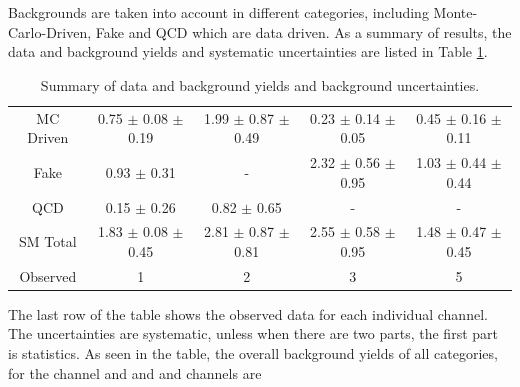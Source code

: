Backgrounds are taken into account in different categories, including Monte-Carlo-Driven, Fake and QCD which are data driven.
As a summary of results, the data and background yields and systematic uncertainties are listed in Table \ref{tbl:yieldSysSummary}. 
\begin{table}[h]
\begin{center}
\begin{tabular}{c|c|c|c|c}
\hline
\hline
		& \tauTau\binone & \tauTau\bintwo & \eTau\binone & \muTau\binone \\
\hline
MC Driven &  0.75 $\pm$ 0.08 $\pm$ 0.19 & 1.99 $\pm$ 0.87 $\pm$ 0.49  & 0.23 $\pm$ 0.14 $\pm$ 0.05 & 0.45 $\pm$ 0.16  $\pm$ 0.11\\
Fake      &     0.93 $\pm$ 0.31         &           -                 &     2.32 $\pm$ 0.56 $\pm$  0.95 & 1.03 $\pm$ 0.44 $\pm$ 0.44\\
QCD       &     0.15 $\pm$ 0.26         &         0.82 $\pm$ 0.65     &           -              &            -       \\
\hline
SM Total  & 1.83 $\pm$ 0.08 $\pm$ 0.45 & 2.81  $\pm$ 0.87 $\pm$0.81  & 2.55 $\pm$ 0.58 $\pm$ 0.95 & 1.48 $\pm$ 0.47  $\pm$ 0.45\\
\hline
\hline
Observed   & 1     & 2     & 3   & 5 \\  
\hline
\hline
\end{tabular}
\caption{Summary of data and background yields and background uncertainties.}
\label{tbl:yieldSysSummary}
\end{center}
\end{table}
The last row of the table shows the observed data for  each individual channel.  The uncertainties are systematic, unless when there are 
two parts, the first part is statistics.
As seen in the table, the overall background yields of all categories, 
for the \tauTau channel \binone and \bintwo and \eTau and \muTau channels are  
